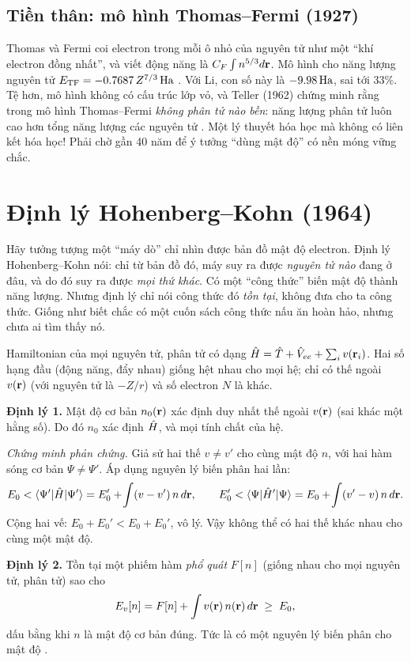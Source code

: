 \subsection{Tiền thân: mô hình Thomas--Fermi (1927)}
Thomas và Fermi coi electron trong mỗi ô nhỏ của nguyên tử như một ``khí electron đồng nhất'', và viết động năng là $C_F\int n^{5/3}d\mathbf r$. Mô hình cho năng lượng nguyên tử $E_{\rm TF}=-0.7687\,Z^{7/3}\,\mathrm{Ha}$ \cite{ParrGhosh1986}. Với Li, con số này là $-9.98\,\mathrm{Ha}$, sai tới 33\%. Tệ hơn, mô hình không có cấu trúc lớp vỏ, và Teller (1962) chứng minh rằng trong mô hình Thomas--Fermi \emph{không phân tử nào bền}: năng lượng phân tử luôn cao hơn tổng năng lượng các nguyên tử \cite{Teller1962}. Một lý thuyết hóa học mà không có liên kết hóa học! Phải chờ gần 40 năm để ý tưởng ``dùng mật độ'' có nền móng vững chắc.

\section{Định lý Hohenberg--Kohn (1964)}

\begin{eli5}
Hãy tưởng tượng một ``máy dò'' chỉ nhìn được bản đồ mật độ electron. Định lý Hohenberg--Kohn nói: chỉ từ bản đồ đó, máy suy ra được \emph{nguyên tử nào} đang ở đâu, và do đó suy ra được \emph{mọi thứ khác}. Có một ``công thức'' biến mật độ thành năng lượng. Nhưng định lý chỉ nói công thức đó \emph{tồn tại}, không đưa cho ta công thức. Giống như biết chắc có một cuốn sách công thức nấu ăn hoàn hảo, nhưng chưa ai tìm thấy nó.
\end{eli5}

\begin{congthuc}
Hamiltonian của mọi nguyên tử, phân tử có dạng $\hat H=\hat T+\hat V_{ee}+\sum_iv(\mathbf r_i)$. Hai số hạng đầu (động năng, đẩy nhau) giống hệt nhau cho mọi hệ; chỉ có thế ngoài $v(\mathbf r)$ (với nguyên tử là $-Z/r$) và số electron $N$ là khác.

\textbf{Định lý 1.} Mật độ cơ bản $n_0(\mathbf r)$ xác định duy nhất thế ngoài $v(\mathbf r)$ (sai khác một hằng số). Do đó $n_0$ xác định $\hat H$, và mọi tính chất của hệ.

\emph{Chứng minh phản chứng.} Giả sử hai thế $v\neq v'$ cho cùng mật độ $n$, với hai hàm sóng cơ bản $\Psi\neq\Psi'$. Áp dụng nguyên lý biến phân hai lần:
\[
E_0<\langle\Psi'|\hat H|\Psi'\rangle=E_0'+\!\int(v-v')\,n\,d\mathbf r,\qquad
E_0'<\langle\Psi|\hat H'|\Psi\rangle=E_0+\!\int(v'-v)\,n\,d\mathbf r .
\]
Cộng hai vế: $E_0+E_0'<E_0+E_0'$, vô lý. Vậy không thể có hai thế khác nhau cho cùng một mật độ.

\textbf{Định lý 2.} Tồn tại một phiếm hàm \emph{phổ quát} $F[n]$ (giống nhau cho mọi nguyên tử, phân tử) sao cho
\[
E_v[n]=F[n]+\int v(\mathbf r)\,n(\mathbf r)\,d\mathbf r\;\ge\;E_0,
\]
dấu bằng khi $n$ là mật độ cơ bản đúng. Tức là có một nguyên lý biến phân cho mật độ \cite{HohenbergKohn1964}.
\end{congthuc}


